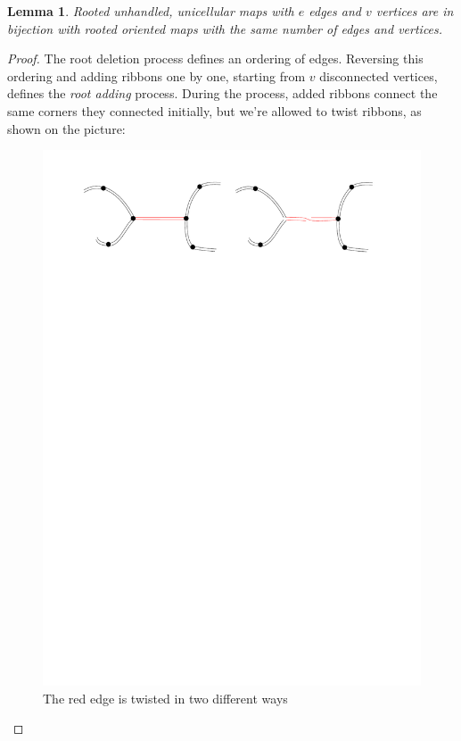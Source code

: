 \documentclass{article}
\newtheorem{lemma}{Lemma}
\begin{document}
\begin{lemma} \label{lemma:unhandled_to_oriented_bijection}
    Rooted unhandled, unicellular maps with $e$ edges and $v$ vertices are in bijection with rooted oriented maps with the same number of edges and vertices.
\end{lemma}
\begin{proof}
	The root deletion process defines an ordering of edges. Reversing this ordering and adding ribbons one by one, starting from $v$ disconnected vertices, defines the \emph{root adding} process. During the process, added ribbons connect the same corners they connected initially, but we're allowed to twist ribbons, as shown on the picture:
	
	\begin{figure}[h]
		
		\includegraphics[scale=0.4]{twist}
		\centering
		\caption{The red edge is twisted in two different ways}
	\end{figure}
	

\end{proof}
\end{document}
